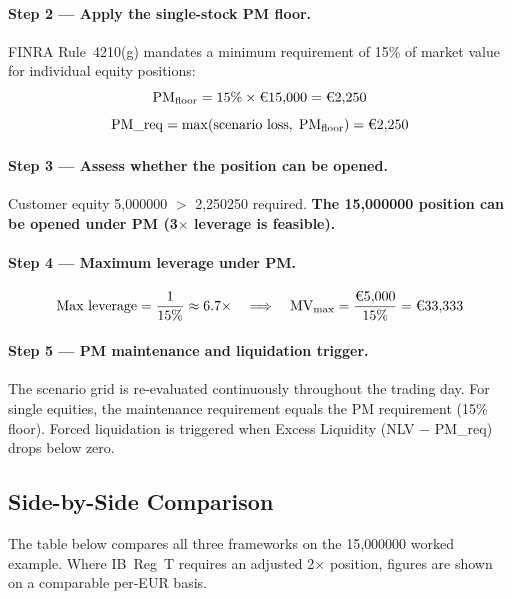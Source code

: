 \documentclass[9pt, a4paper]{extarticle}
\newcommand{\EUR}[1]{\ifmmode\text{\texteuro}#1\else\texteuro#1\fi}
\begin{document}
\paragraph{Step 2 — Apply the single-stock PM floor.}
FINRA Rule~4210(g) mandates a minimum requirement of 15\% of market value for
individual equity positions:
\[
    \mathrm{PM}_{\mathrm{floor}} = 15\% \times \EUR{15{,}000} = \EUR{2{,}250}
\]
\[
    \mathrm{PM\_req} = \max(\text{scenario loss},\; \mathrm{PM}_{\mathrm{floor}}) = \EUR{2{,}250}
\]

\paragraph{Step 3 — Assess whether the position can be opened.}
Customer equity \EUR{5{,}000} $>$ \EUR{2{,}250} required.
\textbf{The \EUR{15{,}000} position can be opened under PM (3$\times$ leverage is feasible).}

\paragraph{Step 4 — Maximum leverage under PM.}
\[
    \text{Max leverage} = \frac{1}{15\%} \approx 6.7{\times}
    \quad\Longrightarrow\quad
    \mathrm{MV}_{\max} = \frac{\EUR{5{,}000}}{15\%} = \EUR{33{,}333}
\]

\paragraph{Step 5 — PM maintenance and liquidation trigger.}
The scenario grid is re-evaluated continuously throughout the trading day.
For single equities, the maintenance requirement equals the PM requirement (15\% floor).
Forced liquidation is triggered when Excess Liquidity (NLV $-$ PM\_req) drops below zero.

\subsection*{Side-by-Side Comparison}

The table below compares all three frameworks on the \EUR{15{,}000} worked example.
Where IB~Reg~T requires an adjusted 2$\times$ position, figures are shown on a
comparable per-EUR basis.
\end{document}
